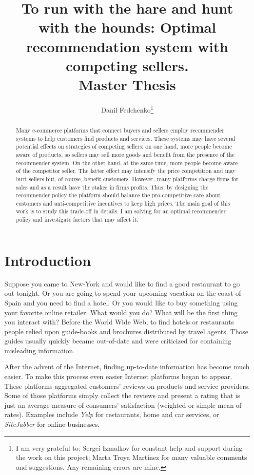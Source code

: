 \documentclass[a4paper]{article}
\title{To run with the hare and hunt with the hounds: Optimal recommendation system with competing sellers. \\ Master Thesis}
\date{}
\author{Danil Fedchenko\thanks{I am very grateful to: Sergei Izmalkov for constant help and support during the work on this project; Marta Troya Martinez for many valuable comments and suggestions. \newline Any remaining errors are mine.}}
\begin{document}
 
	\maketitle
	\begin{abstract}
		Many e-commerce platforms that connect buyers and sellers employ recommender systems to help customers find products and services. These systems may have several potential effects on strategies of competing sellers: on one hand, more people become aware of products, so sellers may sell more goods and benefit from the presence of the recommender system. On the other hand, at the same time, more people become aware of the competitor seller. The latter effect may intensify the price competition and may hurt sellers but, of course, benefit customers. However, many platforms charge firms for sales and as a result have the stakes in firms profits. Thus, by designing the recommender policy the platform should balance the pro-competitive care about customers and anti-competitive incentives to keep high prices. The main goal of this work is to study this trade-off in details. I am solving for an optimal recommender policy and investigate factors that may affect it.
	\end{abstract}
\newpage
\tableofcontents
\newpage
	\section{Introduction}
	
	
		Suppose you came to New-York and would like to find a good restaurant to go out tonight. Or you are going to spend your upcoming vacation on the coast of Spain and you need to find a hotel. Or you would like to buy something using your favorite online retailer. What would you do? What will be the first thing you interact with?  Before the World Wide Web, to find hotels or restaurants people relied upon guide-books and brochures distributed by travel agents. Those guides usually quickly became out-of-date and were criticized for containing misleading information. 
	
	
	
	
	
	After the advent of the Internet, finding up-to-date information has become much easier. To make this process even easier Internet platforms began to appear. These platforms aggregated customers' reviews on products and service providers. Some of those platforms simply collect the reviews and present a rating that is just an average measure of consumers' satisfaction (weighted or simple mean of rates). Examples include \textit{Yelp} for restaurants, home and car services, or \textit{SiteJabber} for online businesses.
	
\end{document}
